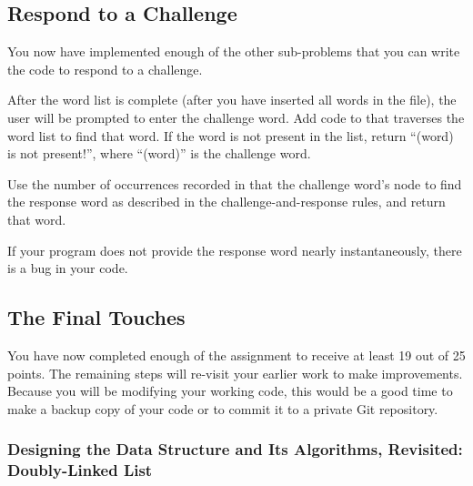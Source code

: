 \subsection{Respond to a Challenge}

You now have implemented enough of the other sub-problems that you can write the code to respond to a challenge.



After the word list is complete (after you have inserted all words in the file), the user will be prompted to enter the challenge word.
Add code to  that traverses the word list to find that word.
If the word is not present in the list, return ``(word) is not present!'', where ``(word)'' is the challenge word.

Use the number of occurrences recorded in that the challenge word's node to find the response word as described in the challenge-and-response rules, and return that word.
%
%

If your program does not provide the response word nearly instantaneously, there is a bug in your code.

\subsection{The Final Touches}

You have now completed enough of the assignment to receive at least 19 out of 25 points.
The remaining steps will re-visit your earlier work to make improvements.
Because you will be modifying your working code, this would be a good time to make a backup copy of your code or to commit it to a private Git repository.

\subsubsection{Designing the Data Structure and Its Algorithms, Revisited: Doubly-Linked List} \label{subsubsec:doublylinkedlist}

